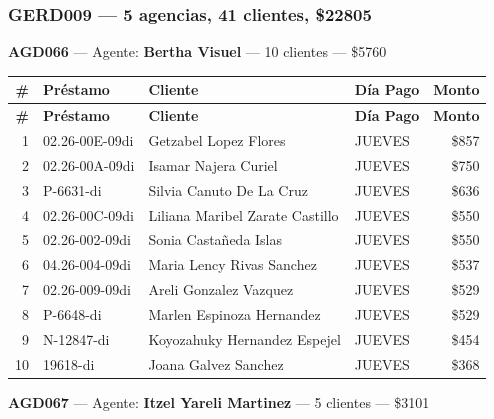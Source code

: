 \documentclass[11pt,a4paper]{article}
\newcommand{\money}[1]{\$\num{#1}}
\begin{document}
\subsubsection{GERD009 --- 5 agencias, 41 clientes, \money{22805}}

\noindent\textbf{AGD066} --- Agente: \textbf{Bertha Visuel} --- 10 clientes --- \money{5760}


\begin{center}
\renewcommand{\arraystretch}{1.1}
\footnotesize
\begin{longtable}{rlp{6.5cm}lr}
\toprule
\textbf{\#} & \textbf{Pr\'estamo} & \textbf{Cliente} & \textbf{D\'ia Pago} & \textbf{Monto} \\
\midrule
\endfirsthead
\toprule
\textbf{\#} & \textbf{Pr\'estamo} & \textbf{Cliente} & \textbf{D\'ia Pago} & \textbf{Monto} \\
\midrule
\endhead
1 & 02.26-00E-09di & Getzabel Lopez Flores & JUEVES & \money{857} \\
2 & 02.26-00A-09di & Isamar Najera Curiel & JUEVES & \money{750} \\
3 & P-6631-di & Silvia Canuto De La Cruz & JUEVES & \money{636} \\
4 & 02.26-00C-09di & Liliana Maribel Zarate Castillo & JUEVES & \money{550} \\
5 & 02.26-002-09di & Sonia Castañeda Islas & JUEVES & \money{550} \\
6 & 04.26-004-09di & Maria Lency Rivas Sanchez & JUEVES & \money{537} \\
7 & 02.26-009-09di & Areli Gonzalez Vazquez & JUEVES & \money{529} \\
8 & P-6648-di & Marlen Espinoza Hernandez & JUEVES & \money{529} \\
9 & N-12847-di & Koyozahuky Hernandez Espejel & JUEVES & \money{454} \\
10 & 19618-di & Joana Galvez Sanchez & JUEVES & \money{368} \\

\bottomrule
\end{longtable}
\end{center}
\noindent\textbf{AGD067} --- Agente: \textbf{Itzel Yareli Martinez} --- 5 clientes --- \money{3101}
\end{document}
